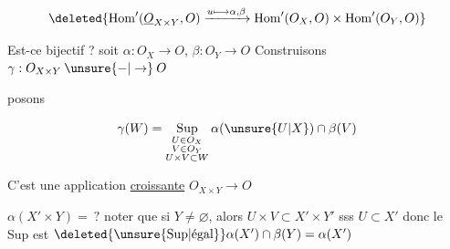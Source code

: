 
\[
\deleted{\operatorname{Hom}'(\underline O_{X\times Y},O)\xrightarrow{u\longmapsto\alpha,\beta}\operatorname{Hom}'(O_X,O)\times\operatorname{Hom}'(O_Y,O)}
\]



Est-ce bijectif ? soit $\alpha:O_X\longrightarrow O$, $\beta:O_Y\longrightarrow O$
Construisons $\gamma:O_{X\times Y}\mathbin{\unsure{-|\to}}O$

posons

\[
\gamma(W)=\operatorname*{Sup}_{\substack{U\in O_X\\V\in O_Y\\U\times V\subset W}}\alpha(\unsure{U|X})\cap\beta(V)
\]


C'est une application \uline{croissante} $O_{X\times Y}\longrightarrow O$


$\alpha(X'\times Y)=\ ?$ noter que si $Y\ne\varnothing$, alors $U\times V\subset X'\times Y'$ sss $U\subset X'$
donc le Sup est $\deleted{\unsure{\mathrm{Sup}|\text{égal}}}\alpha(X')\cap\beta(Y)=\alpha(X')$
